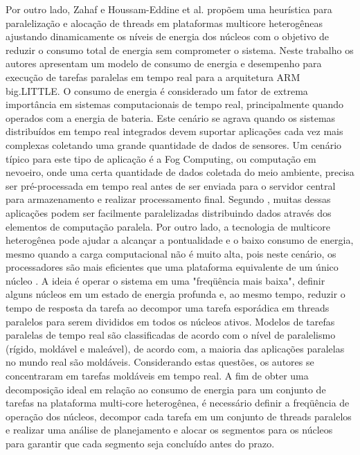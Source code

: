 Por outro lado, Zahaf e Houssam-Eddine et al. \cite{zahaf2017energy} propõem uma heurística para paralelização e alocação de threads em plataformas multicore heterogêneas ajustando dinamicamente os níveis de energia dos núcleos com o objetivo de reduzir o consumo total de energia sem comprometer o sistema. Neste trabalho os autores apresentam um modelo de consumo de energia e desempenho para execução de tarefas paralelas em tempo real para a arquitetura ARM big.LITTLE. O consumo de energia é considerado um fator de extrema importância em sistemas computacionais de tempo real, principalmente quando operados com a energia de bateria. Este cenário se agrava quando os sistemas distribuídos em tempo real integrados devem suportar aplicações cada vez mais complexas coletando uma grande quantidade de dados de sensores. Um cenário típico para este tipo de aplicação é a Fog Computing, ou computação em nevoeiro, onde uma certa quantidade de dados coletada do meio ambiente, precisa ser pré-processada em tempo real antes de ser enviada para o servidor central para armazenamento e realizar processamento final. Segundo \cite{zahaf2017energy}, muitas dessas aplicações podem ser facilmente paralelizadas distribuindo dados através dos elementos de computação paralela. Por outro lado, a tecnologia de multicore heterogênea pode ajudar a alcançar a pontualidade e o baixo consumo de energia, mesmo quando a carga computacional não é muito alta, pois neste cenário, os processadores são mais eficientes que uma plataforma equivalente de um único núcleo \cite{wolf2012computers}. A ideia é operar o sistema em uma "freqüência mais baixa", definir alguns núcleos em um estado de energia profunda e, ao mesmo tempo, reduzir o tempo de resposta da tarefa ao decompor uma tarefa esporádica em threads paralelos para serem divididos em todos os núcleos ativos.
Modelos de tarefas paralelas de tempo real são classificadas de acordo com o nível de paralelismo (rígido, moldável e maleável), de acordo com, \cite{drozdowski2004scheduling,dutot2004scheduling} a maioria das aplicações paralelas no mundo real são moldáveis. Considerando estas questões, os autores se concentraram em tarefas moldáveis em tempo real. A fim de obter uma decomposição ideal em relação ao consumo de energia para um conjunto de tarefas na plataforma multi-core heterogênea, é necessário definir a freqüência de operação dos núcleos, decompor cada tarefa em um conjunto de threads paralelos e realizar uma análise de planejamento e alocar os segmentos para os núcleos para garantir que cada segmento seja concluído antes do prazo.



